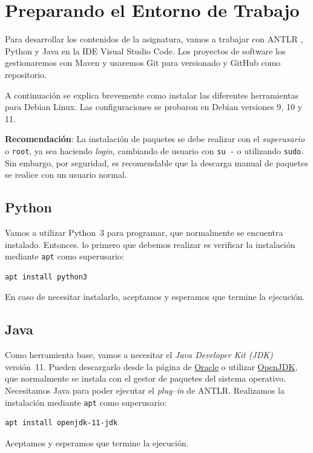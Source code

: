 \section{Preparando el Entorno de Trabajo}
\label{intro}

Para desarrollar los contenidos de la asignatura, vamos a trabajar con ANTLR
\ifx\python\undefined
, Python
\fi
y Java en la IDE Visual Studio Code.  Los proyectos de software los gestionaremos con Maven y usaremos Git para versionado y GitHub como repositorio.

A continuación se explica brevemente como instalar las diferentes herramientas para Debian Linux.  Las configuraciones se probaron en Debian versiones 9, 10 y 11.

\textbf{Recomendación}: La instalación de paquetes se debe realizar con el \emph{superusario} o \verb|root|, ya sea haciendo \emph{login}, cambiando de usuario con \verb|su -| o utilizando \verb|sudo|. Sin embargo, por seguridad, es recomendable que la descarga manual de paquetes se realice con un usuario normal.

\ifx\python\undefined
\subsection{Python}
\label{python}


Vamos a utilizar Python~3 para programar, que normalmente se encuentra instalado. Entonces. lo primero que debemos realizar es verificar la instalación mediante \verb|apt| como superusario:
\begin{lstlisting}[style=consola]
  apt install python3
\end{lstlisting}
En caso de necesitar instalarlo, aceptamos y esperamos que termine la ejecución.
\fi


\subsection{Java}
\label{Java}

Como herramienta base, vamos a necesitar el \emph{Java Developer Kit (JDK)} versión~11. Pueden descargarlo desde la página de \href{https://www.oracle.com/java/technologies/javase-downloads.html}{Oracle} o utilizar \href{https://openjdk.java.net/}{OpenJDK}, que normalmente se instala con el gestor de paquetes del sistema operativo.
\ifx\python\undefined
Necesitamos Java para poder ejecutar el \emph{plug--in} de ANTLR.
\fi
Realizamos la instalación mediante \verb|apt| como superusario:
\begin{lstlisting}[style=consola]
  apt install openjdk-11-jdk
\end{lstlisting}
Aceptamos y esperamos que termine la ejecución.

